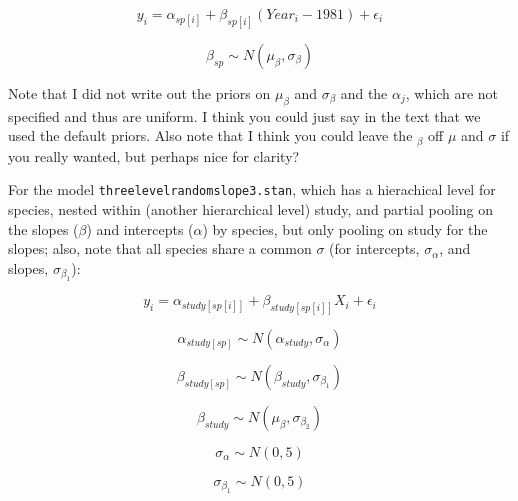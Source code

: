 \documentclass[12pt,a4paper]{article}
\begin{document}
\begin{equation}
y_{i}=\alpha_{sp[i]}+\beta_{sp[i]}(Year_{i}-1981)+\epsilon_{i}
\end{equation}

\begin{equation}
\beta_{sp} \sim N(\mu_{\beta}, \sigma_{\beta})
\end{equation}

\vspace{2ex}

\noindent Note that I did not write out the priors on $\mu_{\beta}$ and $\sigma_{\beta}$ and the $\alpha_{j}$, which are not specified and thus are uniform. I think you could just say in the text that we used the default priors. Also note that I think you could leave the $_{\beta}$ off $\mu$ and $\sigma$ if you really wanted, but perhaps nice for clarity?

\newpage

\noindent For the model \verb|threelevelrandomslope3.stan|, which has a hierachical level for species, nested within (another hierarchical level) study, and partial pooling on the slopes ($\beta$) and intercepts ($\alpha$) by species, but only pooling on study for the slopes; also, note that all species share a common $\sigma$ (for intercepts, $\sigma_{\alpha}$, and slopes, $\sigma_{\beta_{1}}$):

\begin{equation}
y_{i}=\alpha_{study[sp[i]]}+\beta_{study[sp[i]]}X_{i}+\epsilon_{i}
\end{equation}

\begin{equation}
\alpha_{study[sp]} \sim N(\alpha_{study}, \sigma_{\alpha})
\end{equation}


\begin{equation}
\beta_{study[sp]} \sim N(\beta_{study}, \sigma_{\beta_{1}})
\end{equation}


\begin{equation}
\beta_{study} \sim N(\mu_{\beta}, \sigma_{\beta_{2}})
\end{equation}

\begin{equation}
\sigma_{\alpha} \sim N(0,5)
\end{equation}

\begin{equation}
\sigma_{\beta_{1}} \sim N(0,5)
\end{equation}
\end{document}
